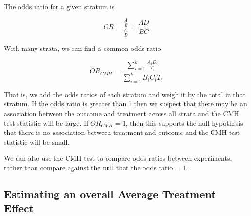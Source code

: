 \documentclass[
  12pt,
]{book}
\theoremstyle{definition}
\theoremstyle{definition}
\theoremstyle{definition}
\theoremstyle{remark}
\begin{document}
The odds ratio for a given stratum is

\[ OR = \frac{\frac{A}{B}}{\frac{C}{D}} = \frac{AD}{BC}\]

With many strata, we can find a common odds ratio

\begin{equation}
 OR_{CMH} = \frac{\sum_{i=1}^{k} \frac{A_{i}D_{i}}{T_{i}}}{\sum_{i=1}^{k}{B_{i}C_{i}}{T_{i}}}
\end{equation}

That is, we add the odds ratios of each stratum and weigh it by the
total in that stratum. If the odds ratio is greater than 1 then we
suspect that there may be an association between the outcome and
treatment across all strata and the CMH test statistic will be large. If
\(OR_{CMH} = 1\), then this supports the null hypothesis that there is
no association between treatment and outcome and the CMH test statistic
will be small.

We can also use the CMH test to compare odds ratios between experiments,
rather than compare against the null that the odds ratio = 1.

\hypertarget{blockrandate}{%
\subsection{Estimating an overall Average Treatment
Effect}\label{blockrandate}}
\end{document}

